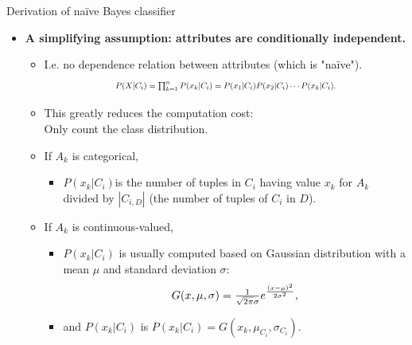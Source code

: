 \documentclass[aspectratio=169,t,table]{beamer}
\begin{document}
  {
    \begin{frame}{Derivation of naïve Bayes classifier}
        \begin{itemize}
          \item \textbf{A simplifying assumption: attributes are {\color{airforceblue}conditionally independent}.}
          \begin{itemize}
            \item I.e. no dependence relation between attributes (which is "naïve").
            \begin{align*}
              \resizebox{7cm}{!}{%
              $P(X|C_i) = \prod_{k=1}^{n} P(x_k|C_i) = P(x_1|C_i)P(x_2|C_i)\cdots P(x_k|C_i).$}
            \end{align*}
            \item This greatly reduces the computation cost:\\
                  Only count the class distribution.
            \item If $A_k$ is categorical,
            \begin{itemize}
              \item $P(x_k|C_i)$is the number of tuples in $C_i$ having value $x_k$ for $A_k$ \\
                    divided by $|C_{i,D}|$ (the number of tuples of $C_i$ in $D$).
            \end{itemize}
            \item If $A_k$ is continuous-valued,
            \begin{itemize}
              \item $P(x_k|C_i)$ is usually computed based on Gaussian distribution with a mean $\mu$ and standard deviation $\sigma$:
              \begin{align*}
                \resizebox{4cm}{!}{%
                $G(x,\mu,\sigma) = \frac{1}{\sqrt{2\pi}\sigma}e^{\frac{(x-\mu)^2}{2\sigma^2}},$}
              \end{align*}
              \item and $P(x_k|C_i)$ is $P(x_k|C_i) = G(x_k,\mu_{C_i},\sigma_{C_i})$.
            \end{itemize}
          \end{itemize}
        \end{itemize}
    \end{frame}
  }
\end{document}

